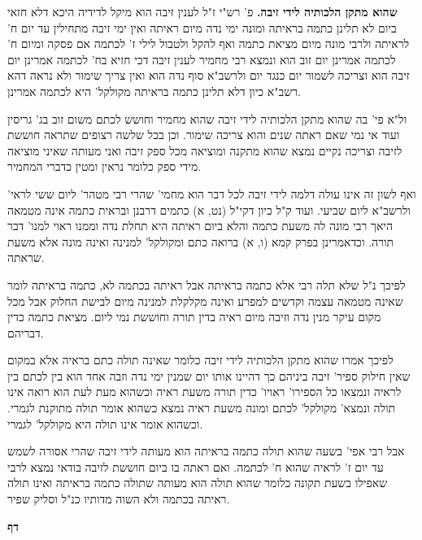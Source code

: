 \documentclass[12pt, openany]{book}
\newcommand{\chapname}{}
\newcommand{\newchap}[1]{
	\addcontentsline{toc}{chapter}{#1}
	\renewcommand{\chapname}{#1}
		\begin{center}
			\textbf{%
\fontsize{16pt}{16pt}\selectfont
				#1}
		\end{center}
}
\begin{document}
{\par\textbf{שהוא מתקן הלכותיה לידי זיבה.}  פ' רש"י ז"ל לענין זיבה הוא מיקל לדידיה היכא דלא חזאי ביום לא תלינן כתמה בראיתה ומונה ימי נדה מיום ראיתה ואין ימי זיבה מתחילין עד יום ח' לראיתה ולרבי מונה מיום מציאת כתמה ואף להקל ולטבול לילי ז' לכתמה אם פסקה ומיום ח' לכתמה אמרינן יום זוב הוא ונמצא רבי מחמיר לענין זיבה דכי חזיא בח' לכתמה אמרינן יום זיבה הוא וצריכה לשמור יום כנגד יום ולרשב"א סוף נדה הוא ואין צריך שימור ולא נראה דהא רשב"א כיון דלא תלינן כתמה בראיתה מקולקל' היא לכתמה אמרינן.\par  ול"א פי' בה שהוא מתקן הלכותיה לידי זיבה שהוא מחמיר וחושש לכתם משום זוב בג' גריסין ועוד אי נמי שאם ראתה שנים והוא צריכה שימור. וכן בכל שלשה רצופים שתראה חוששת לזיבה וצריכה נקיים נמצא שהוא מתקנה ומוציאה מכל ספק זיבה ואני מעותה שאיני מוציאה מידי ספק כלומר נראין ומטין כדברי המחמיר.\par ואף לשון זה אינו עולה דלמה לידי זיבה לכל דבר הוא מחמי' שהרי רבי מטהר' ליום ששי לראי' ולרשב"א ליום שביעי. ועוד ק"ל כיון דקי"ל (נט, א) כתמים דרבנן ובראית כתמה אינה מטמאה היאך רבי מונה לה משעת כתמה והלא ביום ראיתה היא תחלת נדה וממנו ראוי למנו' דבר תורה. וכדאמרינן בפרק קמא (ו, א) ברואה כתם ומקולקל' למנינה ואינה מונה אלא משעת שראתה.\par  לפיכך נ"ל שלא תלה רבי אלא כתמה בראיתה אבל ראיתה בכתמה לא, כתמה בראיתה לומר שאינה מטמאה עצמה וקדשים למפרע ואינה מקלקלת למנינה מיום לבישת החלוק אבל מכל מקום עיקר מנין נדה וזיבה מיום ראיה בדין תורה וחוששת נמי ליום. מציאת כתמה כדין דבריהם.\par  לפיכך אמרו שהוא מתקן הלכותיה לידי זיבה כלומר שאינה תולה כתם בראיה אלא במקום שאין חילוק ספיר' זיבה ביניהם כך דהיינו אותו יום שמנין ימי נדה וזבה אחד הוא בין לכתם בין לראיה ונמצאו כל הספירו' ראויו' כדין תורה משעת ראיה וכשהוא מעת לעת הוא רואה אינו תולה ונמצא' מקולקל' לכתם ומונה משעת ראיה נמצא כשהוא אומר תולה מתוקנת לגמרי. וכשהוא אומר אינו תולה היא מקולקל' לגמרי.\par  אבל רבי אפי' בשעה שהוא תולה כתמה בראיתה הוא מעותה לידי זיבה שהרי אסורה לשמש עד יום ז' לראיה שהוא ח' לכתמה. ואם ראתה בו ביום חוששת לזיבה בודאי נמצא לרבי שאפילו בשעת תקונה כלומר שהוא תולה הוא מעותה שתולה כתמה בראיתה ואינו תולה ראיתה בכתמה ולא השוה מדותיו כנ"ל וסליק שפיר. 
\par}
\newchap{דף }
\end{document}
